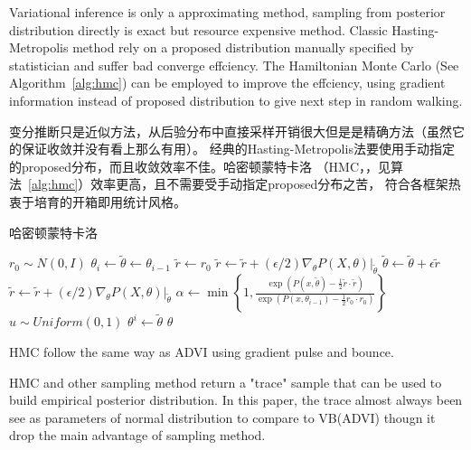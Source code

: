 \documentclass{article}
\begin{document}
Variational inference is only a approximating method, 
sampling from posterior distribution directly is exact but resource expensive method. 
Classic Hasting-Metropolis method rely on a proposed distribution manually specified by statistician
and suffer bad converge effciency. 
The Hamiltonian Monte Carlo \cite{hoffman2014no} (See Algorithm~\ref{alg:hmc}) can be employed to improve the effciency,
using gradient information instead of proposed distribution to give next step in random walking. 

变分推断只是近似方法，从后验分布中直接采样开销很大但是是精确方法（虽然它的保证收敛并没有看上那么有用）。
经典的Hasting-Metropolis法要使用手动指定的proposed分布，而且收敛效率不佳。哈密顿蒙特卡洛
（HMC，\cite{hoffman2014no}，见算法~\ref{alg:hmc}）效率更高，且不需要受手动指定proposed分布之苦，
符合各框架热衷于培育的开箱即用统计风格。

\begin{algorithm}
\caption{哈密顿蒙特卡洛}
\begin{algorithmic}[1]
 
        \State $r_0 \sim N(0,I)$
        \State $\theta_i \gets \tilde{\theta} \gets \theta_{i-1}$
        \State $\tilde{r} \gets r_0$
         
            \State $\tilde{r} \gets \tilde{r} + (\epsilon/2) \nabla_\theta P(X,\theta)|_{\tilde{\theta}}$
            \State $\tilde{\theta} \gets \tilde{\theta} + \epsilon \tilde{r}$
            \State $\tilde{r} \gets \tilde{r} + (\epsilon/2) \nabla_\theta P(X,\theta)|_{\tilde{\theta}}$
        \EndFor
        \State $\alpha \gets \min \left\{ 1, \frac{\exp(P(x,\tilde{\theta})-\frac{1}{2}\tilde{r}\cdot\tilde{r})}{\exp(P(x,\theta_{i-1})-\frac{1}{2}r_0\cdot r_0)} \right\}$
        \State $u \sim Uniform(0,1)$
            \State $\theta^i \gets \tilde{\theta}$
        \EndIf
    \EndFor
    \State \Return $\theta$
\EndProcedure
\end{algorithmic}
\label{alg:hmc}
\end{algorithm}

HMC follow the same way as ADVI using gradient pulse and bounce.

HMC and other sampling method return a "trace" sample that can be used 
to build empirical posterior distribution. In this paper, the trace almost always been see as
parameters of normal distribution to compare to VB(ADVI) thougn it drop the main advantage of sampling method.
\end{document}
